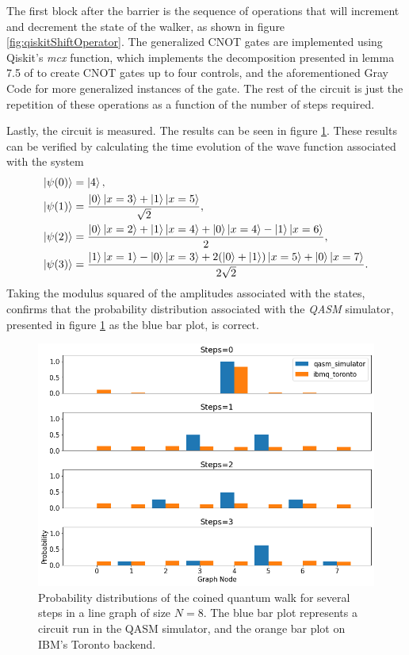 \documentclass[../../dissertation.tex]{subfiles}
\begin{document}
The first block after the barrier is the sequence of operations that will
increment and decrement the state of the walker, as shown in figure
\ref{fig:qiskitShiftOperator}. The generalized CNOT gates are implemented using
Qiskit's \textit{mcx} function, which implements the decomposition presented in
lemma 7.5 of \cite{barenco95} to create CNOT gates up to four controls, and the
aforementioned Gray Code for more generalized instances of the gate. The rest
of the circuit is just the repetition of these operations as a function of the
number of steps required.

Lastly, the circuit is measured. The results can be seen in figure
\ref{fig:coinedQWQiskitDist}. These results can be verified by calculating the
time evolution of the wave function associated with the system
\begin{align}
	\ket{\psi(0)} &= \ket{4},\\
	\ket{\psi(1)} &= \frac{\ket{0}\ket{x=3}+\ket{1}\ket{x=5}}{\sqrt{2}}, \\
	\ket{\psi(2)} &= \frac{\ket{0}\ket{x=2}+\ket{1}\ket{x=4}+\ket{0}\ket{x=4}-\ket{1}\ket{x=6}}{2},\\
	\ket{\psi(3)} &= \frac{\ket{1}\ket{x=1}-\ket{0}\ket{x=3}+2(\ket{0}+\ket{1})\ket{x=5}+\ket{0}\ket{x=7}}{2\sqrt{2}}.
\end{align}
Taking the modulus squared of the amplitudes associated with the states,
confirms that the probability distribution associated with the \textit{QASM}
simulator, presented in figure \ref{fig:coinedQWQiskitDist} as the blue bar
plot, is correct. 
\begin{figure}[!h]
	\centering
	\includegraphics[scale=0.40]{img/Qiskit/CoinedQuantumWalk/CoinedQW_N3_S0123.png}
	\caption{Probability distributions of the coined quantum walk for several steps in a line graph of size $N=8$. The blue bar plot represents a circuit run in the QASM simulator, and the orange bar plot on IBM's Toronto backend.} 
	\label{fig:coinedQWQiskitDist}
\end{figure}
\end{document}
